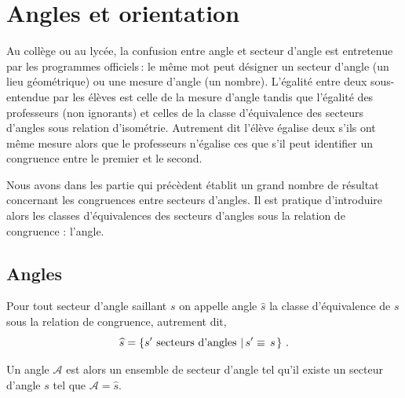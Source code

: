     
    \section{Angles et orientation}

Au collège ou au lycée, la confusion entre angle et secteur d'angle est entretenue par les programmes officiels\,: le même mot  peut désigner un secteur d'angle (un lieu géométrique) ou une mesure d'angle (un nombre). L'égalité entre deux  sous-entendue par les élèves est celle de la mesure d'angle tandis que l'égalité des professeurs (non ignorants) et celles de la classe d'équivalence des secteurs d'angles sous relation d'isométrie. Autrement dit l'élève égalise deux  s'ils ont même mesure alors que le professeurs n'égalise ces  que s'il peut identifier un congruence entre le premier et le second.

Nous avons dans les partie qui précèdent établit un grand nombre de résultat concernant les congruences entre secteurs d'angles. Il est pratique d'introduire alors les classes d'équivalences des secteurs d'angles sous la relation de congruence : l'angle.

        \subsection{Angles}

\begin{defi}[Angles]\label{defi-angle}
    Pour tout secteur d'angle saillant $s$ on appelle angle $\widehat{s}$ la classe d'équivalence de $s$ sous la relation de congruence, autrement dit,
    \begin{equation*}
        \widehat{s} = \left\{s' \text{ secteurs d'angles}\,\left|\,s' \equiv \, s\right.\right\}\,.
    \end{equation*}
    
    Un angle $\mathcal{A}$ est alors un ensemble de secteur d'angle tel qu'il existe un secteur d'angle $s$ tel que $\mathcal{A}=\widehat{s}$. 
\end{defi}

